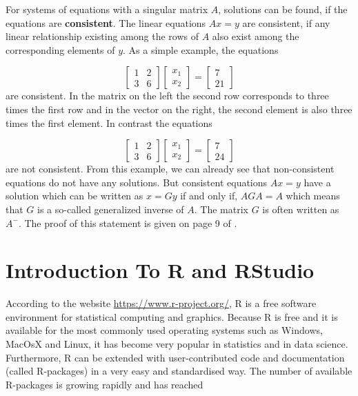 \documentclass[
]{book}
\theoremstyle{definition}
\theoremstyle{definition}
\theoremstyle{definition}
\theoremstyle{remark}
\begin{document}
For systems of equations with a singular matrix \(A\), solutions can be found, if the equations are \textbf{consistent}. The linear equations \(Ax = y\) are consistent, if any linear relationship existing among the rows of \(A\) also exist among the corresponding elements of \(y\). As a simple example, the equations

\[
\left[
\begin{array}{cc}
1  &  2  \\
3  &  6
\end{array}\right]
\left[
\begin{array}{c}
x_1  \\
x_2
\end{array}\right]
=
\left[
\begin{array}{c}
7  \\
21
\end{array}\right]
\]
are consistent. In the matrix on the left the second row corresponds to three times the first row and in the vector on the right, the second element is also three times the first element. In contrast the equations

\[
\left[
\begin{array}{cc}
1  &  2  \\
3  &  6
\end{array}\right]
\left[
\begin{array}{c}
x_1  \\
x_2
\end{array}\right]
=
\left[
\begin{array}{c}
7  \\
24
\end{array}\right]
\]
are not consistent. From this example, we can already see that non-consistent equations do not have any solutions. But consistent equations \(Ax = y\) have a solution which can be written as \(x = Gy\) if and only if, \(AGA = A\) which means that \(G\) is a so-called generalized inverse of \(A\). The matrix \(G\) is often written as \(A^-\). The proof of this statement is given on page 9 of \citep{Searle1971}.

\hypertarget{intro-rstats}{%
\chapter{Introduction To R and RStudio}\label{intro-rstats}}

According to the website \url{https://www.r-project.org/}, R \citep{RCoreTeam2018} is a free software environment for statistical computing and graphics. Because R is free and it is available for the most commonly used operating systems such as Windows, MacOsX and Linux, it has become very popular in statistics and in data science. Furthermore, R can be extended with user-contributed code and documentation (called R-packages) in a very easy and standardised way. The number of available R-packages is growing rapidly and has reached
\end{document}
